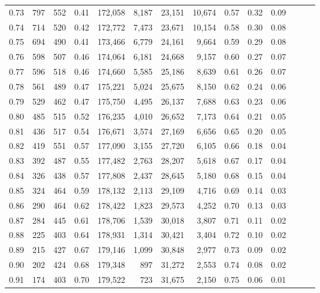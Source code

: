 \begin{tabular}{rrrrrrrrrrrrrr}
0.73 &    797 &  552 &  0.41 &  172,058 &    8,187 &  23,151 &  10,674 &  0.57 &  0.32 &      0.09 \\
0.74 &    714 &  520 &  0.42 &  172,772 &    7,473 &  23,671 &  10,154 &  0.58 &  0.30 &      0.08 \\
0.75 &    694 &  490 &  0.41 &  173,466 &    6,779 &  24,161 &   9,664 &  0.59 &  0.29 &      0.08 \\
0.76 &    598 &  507 &  0.46 &  174,064 &    6,181 &  24,668 &   9,157 &  0.60 &  0.27 &      0.07 \\
0.77 &    596 &  518 &  0.46 &  174,660 &    5,585 &  25,186 &   8,639 &  0.61 &  0.26 &      0.07 \\
0.78 &    561 &  489 &  0.47 &  175,221 &    5,024 &  25,675 &   8,150 &  0.62 &  0.24 &      0.06 \\
0.79 &    529 &  462 &  0.47 &  175,750 &    4,495 &  26,137 &   7,688 &  0.63 &  0.23 &      0.06 \\
0.80 &    485 &  515 &  0.52 &  176,235 &    4,010 &  26,652 &   7,173 &  0.64 &  0.21 &      0.05 \\
0.81 &    436 &  517 &  0.54 &  176,671 &    3,574 &  27,169 &   6,656 &  0.65 &  0.20 &      0.05 \\
0.82 &    419 &  551 &  0.57 &  177,090 &    3,155 &  27,720 &   6,105 &  0.66 &  0.18 &      0.04 \\
0.83 &    392 &  487 &  0.55 &  177,482 &    2,763 &  28,207 &   5,618 &  0.67 &  0.17 &      0.04 \\
0.84 &    326 &  438 &  0.57 &  177,808 &    2,437 &  28,645 &   5,180 &  0.68 &  0.15 &      0.04 \\
0.85 &    324 &  464 &  0.59 &  178,132 &    2,113 &  29,109 &   4,716 &  0.69 &  0.14 &      0.03 \\
0.86 &    290 &  464 &  0.62 &  178,422 &    1,823 &  29,573 &   4,252 &  0.70 &  0.13 &      0.03 \\
0.87 &    284 &  445 &  0.61 &  178,706 &    1,539 &  30,018 &   3,807 &  0.71 &  0.11 &      0.02 \\
0.88 &    225 &  403 &  0.64 &  178,931 &    1,314 &  30,421 &   3,404 &  0.72 &  0.10 &      0.02 \\
0.89 &    215 &  427 &  0.67 &  179,146 &    1,099 &  30,848 &   2,977 &  0.73 &  0.09 &      0.02 \\
0.90 &    202 &  424 &  0.68 &  179,348 &      897 &  31,272 &   2,553 &  0.74 &  0.08 &      0.02 \\
0.91 &    174 &  403 &  0.70 &  179,522 &      723 &  31,675 &   2,150 &  0.75 &  0.06 &      0.01 \\

\end{tabular}
